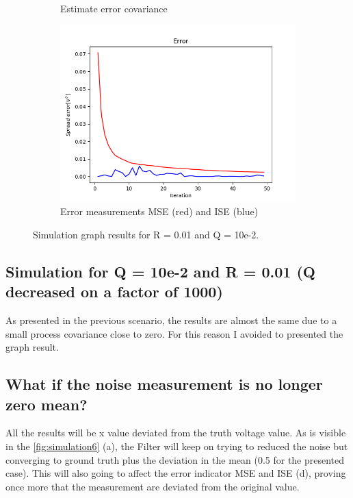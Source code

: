 \documentclass{article}
\begin{document}
\begin{figure}
\begin{subfigure} {.5\textwidth}
            \caption{Estimate error covariance}
        \end{subfigure}
        \begin{subfigure}{.5\textwidth}            
            \centering
            \includegraphics[width=0.8\linewidth]{./img/r01q-2_E.png}
            \caption{Error measurements MSE (red) and ISE (blue)}
        \end{subfigure}
        \caption{Simulation graph results for R = 0.01 and Q = 10e-2.}
        \label{fig:simulation5}
    \end{figure}

    \subsection{Simulation for Q = 10e-2 and R = 0.01 (Q decreased on a factor of 1000)}
    
    As presented in  the previous scenario, the results are almost the same due to a small process covariance close to zero.
    For this reason I avoided to presented the graph result.


    \subsection{What if the noise measurement is no longer zero mean?}
    
        All the results will be x value deviated from the truth voltage value. As is visible in
        the \ref{fig:simulation6} (a), the Filter will keep on trying to reduced the noise but 
        converging to ground truth plus the deviation in the mean (0.5 for the presented case). This will
        also going to affect the error indicator MSE and ISE (d), proving once more that the measurement are deviated from
        the original value. 
\end{document}
